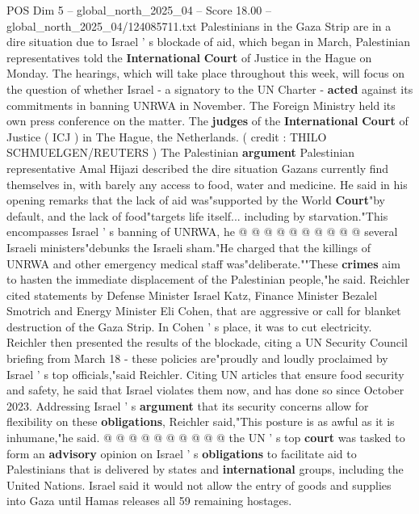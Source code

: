 \begin{textsample}{POS Dim 5 – global\_north\_2025\_04 – Score 18.00 – global\_north\_2025\_04/124085711.txt}  \label{ex:f5_pos_092}
Palestinians in the Gaza Strip are in a dire situation due to Israel ' s blockade of aid, which began in March, Palestinian representatives told the \textbf{International} \textbf{Court} of Justice in the Hague on Monday.
The hearings, which will take place throughout this week, will focus on the question of whether Israel - a signatory to the UN Charter - \textbf{acted} against its commitments in banning UNRWA in November.
The Foreign Ministry held its own press conference on the matter.
The \textbf{judges} of the \textbf{International} \textbf{Court} of Justice ( ICJ ) in The Hague, the Netherlands. ( credit : THILO SCHMUELGEN/REUTERS ) The Palestinian \textbf{argument} Palestinian representative Amal Hijazi described the dire situation Gazans currently find themselves in, with barely any access to food, water and medicine.
He said in his opening remarks that the lack of aid was"supported by the World \textbf{Court}"by default, and the lack of food"targets life itself... including by starvation."This encompasses Israel ' s banning of UNRWA, he @ @ @ @ @ @ @ @ @ @ several Israeli ministers"debunks the Israeli sham."He charged that the killings of UNRWA and other emergency medical staff was"deliberate.""These \textbf{crimes} aim to hasten the immediate displacement of the Palestinian people,"he said.
Reichler cited statements by Defense Minister Israel Katz, Finance Minister Bezalel Smotrich and Energy Minister Eli Cohen, that are aggressive or call for blanket destruction of the Gaza Strip.
In Cohen ' s place, it was to cut electricity.
Reichler then presented the results of the blockade, citing a UN Security Council briefing from March 18 - these policies are"proudly and loudly proclaimed by Israel ' s top officials,"said Reichler.
Citing UN articles that ensure food security and safety, he said that Israel violates them now, and has done so since October 2023.
Addressing Israel ' s \textbf{argument} that its security concerns allow for flexibility on these \textbf{obligations}, Reichler said,"This posture is as awful as it is inhumane,"he said. @ @ @ @ @ @ @ @ @ @ the UN ' s top \textbf{court} was tasked to form an \textbf{advisory} opinion on Israel ' s \textbf{obligations} to facilitate aid to Palestinians that is delivered by states and \textbf{international} groups, including the United Nations.
Israel said it would not allow the entry of goods and supplies into Gaza until Hamas releases all 59 remaining hostages.

\end{textsample}
